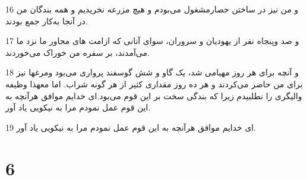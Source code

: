 \par 16 و من نیز در ساختن حصارمشغول می‌بودم و هیچ مزرعه نخریدیم و همه بندگان من در آنجا به‌کار جمع بودند.
\par 17 و صد وپنجاه نفر از یهودیان و سروران، سوای آنانی که ازامت های مجاور ما نزد ما می‌آمدند، بر سفره من خوراک می‌خوردند.
\par 18 و آنچه برای هر روز مهیامی شد، یک گاو و شش گوسفند پرواری می‌بود ومرغها نیز برای من حاضر می‌کردند و هر ده روز مقداری کثیر از هر گونه شراب. اما معهذا وظیفه والیگری را نطلبیدم زیرا که بندگی سخت بر این قوم می‌بود.‌ای خدایم موافق هر‌آنچه به این قوم عمل نمودم مرا به نیکویی یاد آور.
\par 19 ‌ای خدایم موافق هر‌آنچه به این قوم عمل نمودم مرا به نیکویی یاد آور.
 
\chapter{6}

